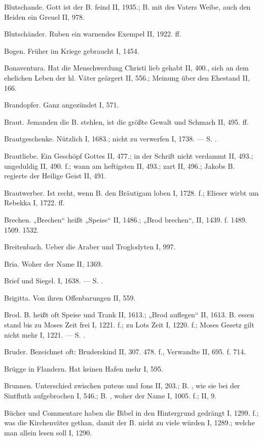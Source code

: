 Blutschande. Gott ist der B. feind II, 1935.; B. mit des Vaters Weibe, auch den Heiden ein Greuel II, 978.

Blutschänder. Ruben ein warnendes Exempel II, 1922. ff.

Bogen. Früher im Kriege gebraucht I, 1454.

Bonaventura. Hat die Menschwerdung Christi lieb gehabt II, 400., sich an dem ehelichen Leben der hl. Väter geärgert II, 556.; Meinung über den Ehestand II, 166.

Brandopfer. Ganz angezündet I, 571.

Braut. Jemanden die B. stehlen, ist die größte Gewalt und Schmach II, 495. ff.

Brautgeschenke. Nützlich I, 1683.; nicht zu verwerfen I, 1738. — S. .

Brautliebe. Ein Geschöpf Gottes II, 477.; in der Schrift nicht verdammt II, 493.; ungeduldig II, 490. f.; wann am heftigsten II, 493.; zart II, 496.; Jakobs B. regierte der Heilige Geist II, 491.

Brautwerber. Ist recht, wenn B. den Bräutigam loben I, 1728. f.; Elieser wirbt um Rebekka I, 1722. ff.

Brechen. „Brechen“ heißt „Speise“ II, 1486.; „Brod brechen“, II, 1439. f. 1489. 1509. 1532.

Breitenbach. Ueber die Araber und Troglodyten I, 997.

Bria. Woher der Name II, 1369.

Brief und Siegel. I, 1638. — S. .

Brigitta. Von ihren Offenbarungen II, 559.

Brod. B. heißt oft Speise und Trank II, 1613.; „Brod auflegen“ II, 1613.  B. essen stand bis zu Moses Zeit frei I, 1221. f.; zu Lots Zeit I, 1220. f.; Moses Gesetz gilt nicht mehr I, 1221. — S. .

Bruder. Bezeichnet oft: Bruderskind II, 307. 478. f., Verwandte II, 695. f. 714.

Brügge in Flandern. Hat keinen Hafen mehr I, 595.

Brunnen. Unterschied zwischen puteus und fons II, 203.; B. , wie sie bei der Sintfluth aufgebrochen I, 546.; B. , woher der Name I, 1005. f.; II, 9.

Bücher und Commentare haben die Bibel in den Hintergrund gedrängt I, 1299. f.; was die Kirchenväter gethan, damit der B. nicht zu viele würden I, 1289.; welche man allein lesen soll I, 1290.

